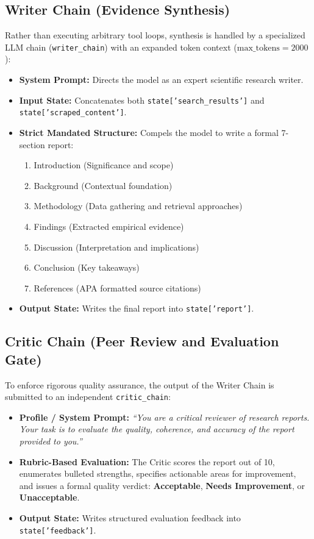 \documentclass[12pt,a4paper]{report}
\begin{document}
\subsection{Writer Chain (Evidence Synthesis)}
Rather than executing arbitrary tool loops, synthesis is handled by a specialized LLM chain (\texttt{writer\_chain}) with an expanded token context ($\text{max\_tokens} = 2000$):
\begin{itemize}
    \item \textbf{System Prompt:} Directs the model as an expert scientific research writer.
    \item \textbf{Input State:} Concatenates both \texttt{state['search\_results']} and \texttt{state['scraped\_content']}.
    \item \textbf{Strict Mandated Structure:} Compels the model to write a formal 7-section report:
    \begin{enumerate}
        \item Introduction (Significance and scope)
        \item Background (Contextual foundation)
        \item Methodology (Data gathering and retrieval approaches)
        \item Findings (Extracted empirical evidence)
        \item Discussion (Interpretation and implications)
        \item Conclusion (Key takeaways)
        \item References (APA formatted source citations)
    \end{enumerate}
    \item \textbf{Output State:} Writes the final report into \texttt{state['report']}.
\end{itemize}

\subsection{Critic Chain (Peer Review and Evaluation Gate)}
To enforce rigorous quality assurance, the output of the Writer Chain is submitted to an independent \texttt{critic\_chain}:
\begin{itemize}
    \item \textbf{Profile / System Prompt:} \textit{``You are a critical reviewer of research reports. Your task is to evaluate the quality, coherence, and accuracy of the report provided to you.''}
    \item \textbf{Rubric-Based Evaluation:} The Critic scores the report out of 10, enumerates bulleted strengths, specifies actionable areas for improvement, and issues a formal quality verdict: \textbf{Acceptable}, \textbf{Needs Improvement}, or \textbf{Unacceptable}.
    \item \textbf{Output State:} Writes structured evaluation feedback into \texttt{state['feedback']}.
\end{itemize}
\end{document}
